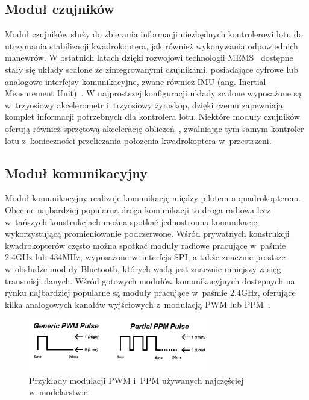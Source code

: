 \subsection{Moduł czujników}

Moduł czujników służy do zbierania informacji niezbędnych kontrolerowi lotu do utrzymania stabilizacji kwadrokoptera, jak również wykonywania odpowiednich manewrów. W ostatnich latach dzięki rozwojowi technologii MEMS~\cite{mems1} dostępne stały się układy scalone ze zintegrowanymi czujnikami, posiadające cyfrowe lub analogowe interfejsy komunikacyjne, zwane również IMU (ang. Inertial Measurement Unit)~\cite{mems2}. W najprostszej konfiguracji układy scalone wyposażone są w~trzyosiowy akcelerometr i~trzyosiowy żyroskop, dzięki czemu zapewniają komplet informacji potrzebnych dla kontrolera lotu. Niektóre moduły czujników oferują również sprzętową akcelerację obliczeń~\cite{ds_mpu6050}, zwalniając tym samym kontroler lotu z~konieczności przeliczania położenia kwadrokoptera w~przestrzeni. 

\subsection{Moduł komunikacyjny}

Moduł komunikacyjny realizuje komunikację między pilotem a quadrokopterem. Obecnie najbardziej popularna droga komunikacji to droga radiowa lecz w~tańszych konstrukcjach można spotkać jednostronną komunikację wykorzystującą promieniowanie podczerwone. Wśród prywatnych konstrukcji kwadrokopterów często można spotkać moduły radiowe pracujące w~paśmie 2.4GHz lub 434MHz, wyposażone w~interfejs SPI, a także znacznie prostsze w~obsłudze moduły Bluetooth, których wadą jest znacznie mniejszy zasięg transmisji danych. Wśród gotowych modułów komunikacyjnych dostepnych na rynku najbardziej popularne są moduły pracujące w~paśmie 2.4GHz, oferujące kilka analogowych kanałów wyjściowych z~modulacją PWM lub PPM~\cite{quadro16,quadro17,quadro18,quadro19}. 

\begin{figure}[H]
	\centering
		\includegraphics[width=0.7\textwidth]{Pictures/quadrotor_controller_pwm_ppm.png}
	\caption[Przykłady modulacji w modelarstwie]{Przykłady modulacji PWM i~PPM używanych najczęściej w~modelarstwie}
	\label{fig:quadrotor_modules.png}
\end{figure}

